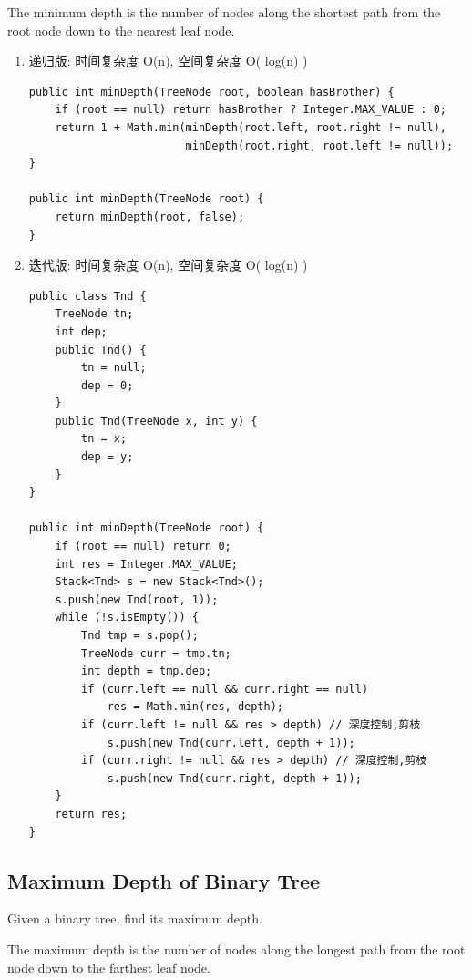 \documentclass[12pt]{book}
\begin{document}
The minimum depth is the number of nodes along the shortest path from the root node down to the nearest leaf node.
\begin{enumerate}
\item 递归版: 时间复杂度 O(n), 空间复杂度 O( log(n) )
\label{sec-4-5-1-1}

\lstset{language=java,label= ,caption= ,numbers=none}
\begin{lstlisting}
public int minDepth(TreeNode root, boolean hasBrother) {
    if (root == null) return hasBrother ? Integer.MAX_VALUE : 0;
    return 1 + Math.min(minDepth(root.left, root.right != null),
                        minDepth(root.right, root.left != null));
}
        
public int minDepth(TreeNode root) {
    return minDepth(root, false);
}
\end{lstlisting}

\item 迭代版: 时间复杂度 O(n), 空间复杂度 O( log(n) )
\label{sec-4-5-1-2}

\lstset{language=java,label= ,caption= ,numbers=none}
\begin{lstlisting}
public class Tnd {
    TreeNode tn;
    int dep;
    public Tnd() {
        tn = null;
        dep = 0;
    }
    public Tnd(TreeNode x, int y) {
        tn = x;
        dep = y;
    }
}

public int minDepth(TreeNode root) {
    if (root == null) return 0;
    int res = Integer.MAX_VALUE;
    Stack<Tnd> s = new Stack<Tnd>();
    s.push(new Tnd(root, 1));
    while (!s.isEmpty()) {
        Tnd tmp = s.pop();
        TreeNode curr = tmp.tn;
        int depth = tmp.dep;
        if (curr.left == null && curr.right == null)
            res = Math.min(res, depth);
        if (curr.left != null && res > depth) // 深度控制,剪枝
            s.push(new Tnd(curr.left, depth + 1));
        if (curr.right != null && res > depth) // 深度控制,剪枝
            s.push(new Tnd(curr.right, depth + 1));
    }
    return res;
}
\end{lstlisting}
\end{enumerate}

\subsection{Maximum Depth of Binary Tree}
\label{sec-4-5-2}
Given a binary tree, find its maximum depth.

The maximum depth is the number of nodes along the longest path from the root node down to the farthest leaf node.
\end{document}

